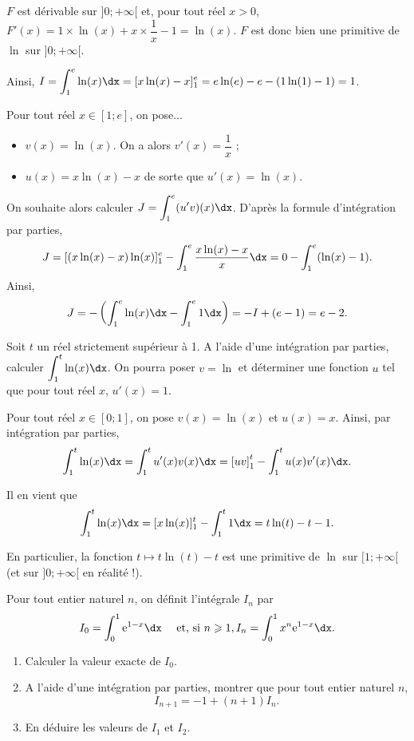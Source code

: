 \documentclass[11pt,fleqn, openany]{book} %
\begin{document}
\begin{solution}$F$ est dérivable sur $]0;+\infty[$ et, pour tout réel $x>0$, $F'(x)=1\times \ln(x)+x \times \dfrac{1}{x} - 1 = \ln(x)$. $F$ est donc bien une primitive de $\ln$ sur $]0;+\infty[$.

Ainsi, $I=\displaystyle\int_1^e \ln(x)\dx = [x\ln(x)-x]_1^e = e\ln(e) - e -(1\ln(1)-1) = 1$.

Pour tout réel \(x\in[1;e]\), on pose...
\begin{itemize}
\item  \(v(x)=\ln(x)\). On a alors \(v'(x)=\dfrac{1}{x}\) ;
\item  \(u(x)=x\ln(x)-x\) de sorte que \(u'(x)=\ln(x)\).
\end{itemize}

On souhaite alors calculer \(J=\displaystyle\int_{1}^e (u'v)(x)\dx\). D'après la formule d'intégration par parties,
\[ J = [(x\ln(x)-x)\ln(x)]_1^e - \displaystyle\int_1^e \dfrac{x\ln(x)-x}{x}\dx = 0 - \displaystyle\int_1^e(\ln(x)-1).\]
Ainsi,
\[J=-\left(\displaystyle\int_1^e\ln(x)\dx-\displaystyle\int_1^e 1\dx\right) = -I+(e-1)=e-2.\]
\end{solution}



\begin{exercise}[topic=int03]
Soit $t$ un réel strictement supérieur à 1. A l'aide d'une intégration par parties, calculer $\displaystyle\int_{1}^t \ln(x)\dx$. On pourra poser $v=\ln$ et déterminer une fonction $u$ tel que pour tout réel $x$, $u'(x)=1$.\end{exercise}

\begin{solution}
	Pour tout réel \(x \in [0;1]\), on pose \(v(x)=\ln(x)\) et \(u(x)=x\). Ainsi, par intégration par parties,
	\[\displaystyle\int_{1}^t \ln(x)\dx = \displaystyle\int_{1}^t u'(x)v(x)\dx = \left[uv\right]_1^t-\displaystyle\int_{1}^t u(x)v'(x)\dx.\]

	Il en vient que 
	\[\displaystyle\int_{1}^t \ln(x)\dx = [x\ln(x)]_1^t-\displaystyle\int_{1}^t 1\dx = t\ln(t)-t-1.\]

	En particulier, la fonction \(t \mapsto t\ln(t)-t\) est une primitive de \(\ln\) sur \([1;+\infty[\) (et sur \(]0;+\infty[\) en réalité !).

\end{solution}





\begin{exercise}[topic=int03]
Pour tout entier naturel $n$, on définit l'intégrale $I_n$ par
\[ I_0=\int_0^1\e^{1-x}\dx \quad \text{ et, si }n \geqslant 1, I_n=\int_0^1x^n\e^{1-x}\dx.\]	
\begin{enumerate}
\item Calculer la valeur exacte de $I_0$.
\item A l'aide d'une intégration par parties, montrer que pour tout entier naturel $n$, \[I_{n+1}=-1+(n+1)I_n.\]
\item En déduire les valeurs de $I_1$ et $I_2$.
\end{enumerate}\end{exercise}
\end{document}
